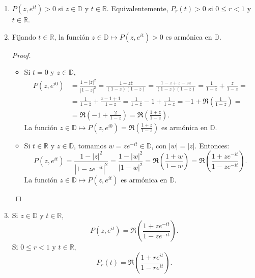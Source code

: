 \begin{properties}
    \hfill
    \begin{enumerate}
        \item $P(z, e^{it}) > 0$ si $z \in \mathbb{D}$ y $t \in \mathbb{R}$.
              Equivalentemente, $P_r(t) > 0$ si $0 \leq r < 1$ y $t \in \mathbb{R}$.

        \item Fijando $t \in \mathbb{R}$, la función $z \in \mathbb{D} \mapsto P(z, e^{it}) > 0$ es armónica en $\mathbb{D}$.
              \begin{proof}
                  \hfill
                  \begin{itemize}
                      \item Si $t = 0$ y $z \in \mathbb{D}$,
                            \begin{align*}
                                P(z, e^{i0}) & = \frac{1-|z|^2}{|1-z|^2} = \frac{1-z\overline{z}}{(1-z)(1-\overline{z})} = \frac{1-z+z-z\overline{z}}{(1-z)(1-\overline{z})} = \frac{1}{1-\overline{z}} + \frac{z}{1-z} = \\
                                             & = \frac{1}{1-\overline{z}} + \frac{z-1+1}{1-z} = \frac{1}{1-\overline{z}} - 1 + \frac{1}{1-z} = -1 + \Re\left(\frac{1}{1-z}\right) =                                       \\
                                             & = \Re\left(-1 + \frac{2}{1-z}\right) = \Re\left(\frac{1+z}{1-z}\right).
                            \end{align*}
                            La función $z \in \mathbb{D} \mapsto P(z, e^{i0}) = \Re\left(\frac{1+z}{1-z}\right)$ es armónica en $\mathbb{D}$.

                      \item Si $t \in \mathbb{R}$ y $z \in \mathbb{D}$, tomamos $w = ze^{-it} \in \mathbb{D}$, con $|w| = |z|$.
                            Entonces:
                            $$P(z, e^{it}) = \frac{1-|z|^2}{|1-ze^{-it}|^2} = \frac{1-|w|^2}{|1-w|^2} = \Re\left(\frac{1+w}{1-w}\right) = \Re\left(\frac{1+ze^{-it}}{1-ze^{-it}}\right).$$
                            La función $z \in \mathbb{D} \mapsto P(z, e^{it})$ es armónica en $\mathbb{D}$.
                  \end{itemize}
              \end{proof}

        \item Si $z \in \mathbb{D}$ y $t \in \mathbb{R}$,
              $$P(z, e^{it}) = \Re\left(\frac{1+ze^{-it}}{1-ze^{-it}}\right).$$
              Si $0 \leq r < 1$ y $t \in \mathbb{R}$,
              $$P_r(t) = \Re\left(\frac{1+re^{it}}{1-re^{it}}\right).$$


\end{enumerate}
\end{properties}
